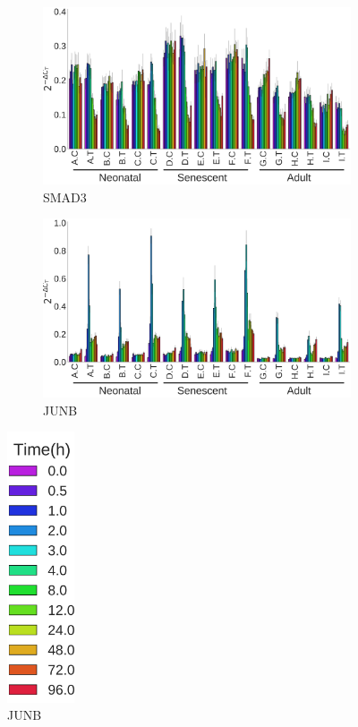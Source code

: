 \documentclass[alpha-refs]{wiley-article}
\begin{document}
\begin{figure}[p]
\begin{minipage}{0.9\textwidth}
		\begin{subfigure}[b]{0.45\textwidth}
			\includegraphics[width=\textwidth]{img/dct_for_publication_no_legend/SMAD3}
			\caption{SMAD3}\label{SMAD3}
		\end{subfigure}\hspace*{\fill}
		\begin{subfigure}[b]{0.45\textwidth}
			\includegraphics[width=\textwidth]{img/dct_for_publication_no_legend/JUNB}
			\caption{JUNB}\label{JUNB}
		\end{subfigure}\hspace*{\fill}
	\end{minipage}%
	\begin{minipage}{0.1\textwidth}
		\includegraphics[width=\textwidth,height=8cm]{img/dct_for_publication_no_legend/legend}

\end{minipage}
\end{figure}
\end{document}
